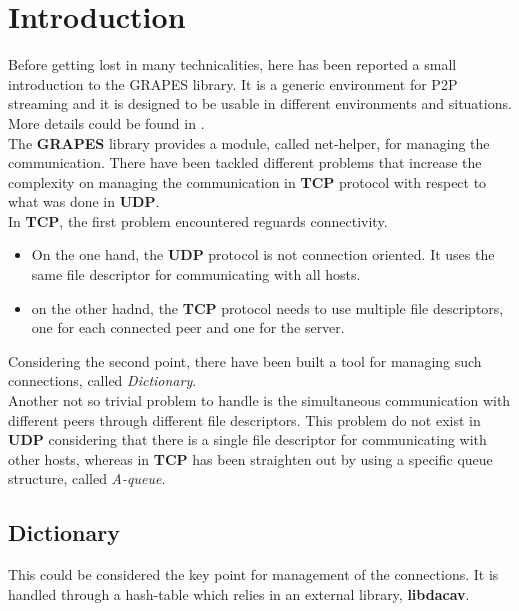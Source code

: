 \section{Introduction}
\label{ch:intro}
Before getting lost in many technicalities, here has been reported a small
introduction to the GRAPES library. It is a generic environment for P2P
streaming and it is designed to be usable in different environments and
situations. More details could be found in \cite{disi10-038}.\\
The \textbf{GRAPES} library provides a module,
called net-helper, for managing the communication. 
There have been tackled different problems that increase the complexity on managing the communication in
\textbf{TCP} protocol with respect to what was done in \textbf{UDP}.\\
In \textbf{TCP}, the first problem encountered reguards connectivity.
\begin{itemize}
 \item On the one hand, the \textbf{UDP} protocol is not connection oriented. It uses the same file descriptor for communicating with all hosts.
 \item on the other hadnd, the \textbf{TCP} protocol needs to use multiple file descriptors, one for each connected peer and one for the server.
\end{itemize}
Considering the second point, there have been built a tool for managing such connections, called \textit{Dictionary}.\\
Another not so trivial problem to handle is the simultaneous communication with different peers through different
file descriptors. This problem do not exist in \textbf{UDP} considering that there is a single file descriptor
for communicating with other hosts, whereas in \textbf{TCP} has been straighten out by using a specific
queue structure, called \textit{A-queue}.

\subsection{Dictionary}
This could be considered the key point for management of the connections. It is handled through a hash-table
which relies in an external library, \textbf{libdacav}.\\
